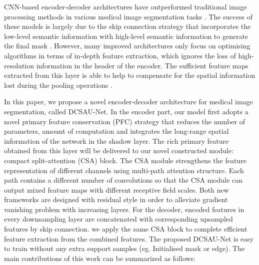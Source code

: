 \documentclass[a4paper,fleqn]{cas-dc}
\begin{document}
CNN-based encoder-decoder architectures have outperformed traditional image processing methods in various medical image segmentation tasks \cite{litjens2017survey}. The success of these models is largely due to the skip connection strategy that incorporates the low-level semantic information with high-level semantic information to generate the final mask \cite{chen2019multi}. However, many improved architectures only focus on optimising algorithms in terms of in-depth feature extraction, which ignores the loss of high-resolution information in the header of the encoder. The sufficient feature maps extracted from this layer is able to help to compensate for the spatial information lost during the pooling operations \cite{wang2022uctransnet}.

In this paper, we propose a novel encoder-decoder architecture for medical image segmentation, called DCSAU-Net. In the encoder part, our model first adopts a novel primary feature conservation (PFC) strategy that reduces the number of parameters, amount of computation and integrates the long-range spatial information of the network in the shadow layer. The rich primary feature obtained from this layer will be delivered to our novel constructed module: compact split-attention (CSA) block. The CSA module strengthens the feature representation of different channels using multi-path attention structure. Each path contains a different number of convolutions so that the CSA module can output mixed feature maps with different receptive field scales. Both new frameworks are designed with residual style in order to alleviate gradient vanishing problem with increasing layers. For the decoder, encoded features in every downsampling layer are concatenated with corresponding upsampled features by skip connection. we apply the same CSA block to complete efficient feature extraction from the combined features. The proposed DCSAU-Net is easy to train without any extra support samples (eg. Initialised mask or edge). The main contributions of this work can be summarized as follows:
\end{document}
